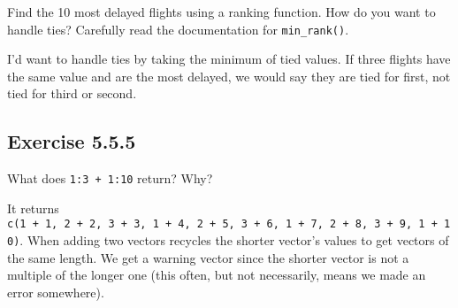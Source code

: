 \documentclass[]{book}
\newenvironment{Shaded}{\begin{snugshade}}{\end{snugshade}}
\newcommand{\CommentTok}[1]{\textcolor[rgb]{0.56,0.35,0.01}{\textit{#1}}}
\newcommand{\DataTypeTok}[1]{\textcolor[rgb]{0.13,0.29,0.53}{#1}}
\newcommand{\DecValTok}[1]{\textcolor[rgb]{0.00,0.00,0.81}{#1}}
\newcommand{\KeywordTok}[1]{\textcolor[rgb]{0.13,0.29,0.53}{\textbf{#1}}}
\newcommand{\NormalTok}[1]{#1}
\newcommand{\OperatorTok}[1]{\textcolor[rgb]{0.81,0.36,0.00}{\textbf{#1}}}
\newcommand{\StringTok}[1]{\textcolor[rgb]{0.31,0.60,0.02}{#1}}
\theoremstyle{plain}
\theoremstyle{remark}
\begin{document}
Find the 10 most delayed flights using a ranking function. How do you
want to handle ties? Carefully read the documentation for
\texttt{min\_rank()}.

I'd want to handle ties by taking the minimum of tied values. If three
flights have the same value and are the most delayed, we would say they
are tied for first, not tied for third or second.

\begin{Shaded}
\end{Shaded}

\hypertarget{exercise-5.5.5}{%
\subsection*{\texorpdfstring{Exercise
{5.5.5}}{Exercise 5.5.5}}\label{exercise-5.5.5}}

What does \texttt{1:3\ +\ 1:10} return? Why?

It returns
\texttt{c(1\ +\ 1,\ 2\ +\ 2,\ 3\ +\ 3,\ 1\ +\ 4,\ 2\ +\ 5,\ 3\ +\ 6,\ 1\ +\ 7,\ 2\ +\ 8,\ 3\ +\ 9,\ 1\ +\ 10)}.
When adding two vectors recycles the shorter vector's values to get
vectors of the same length. We get a warning vector since the shorter
vector is not a multiple of the longer one (this often, but not
necessarily, means we made an error somewhere).
\end{document}
